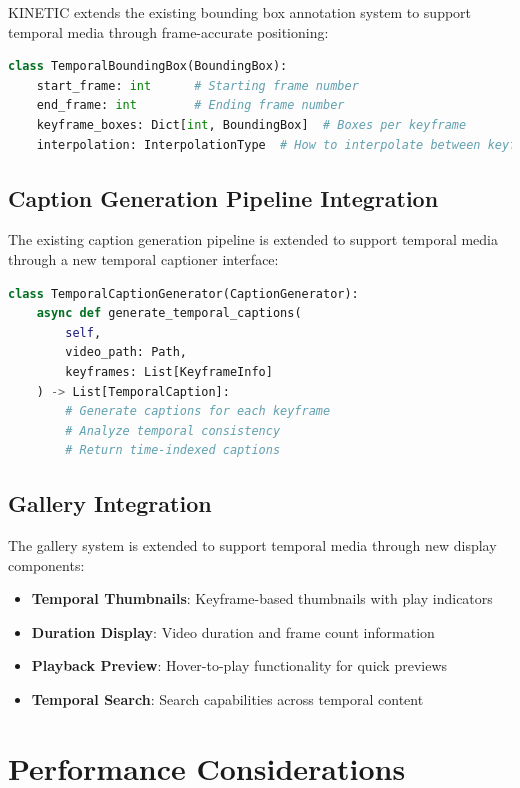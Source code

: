 \documentclass[10pt]{article}
\begin{document}
KINETIC extends the existing bounding box annotation system to support temporal media through frame-accurate positioning:

\begin{lstlisting}[language=Python]
class TemporalBoundingBox(BoundingBox):
    start_frame: int      # Starting frame number
    end_frame: int        # Ending frame number
    keyframe_boxes: Dict[int, BoundingBox]  # Boxes per keyframe
    interpolation: InterpolationType  # How to interpolate between keyframes
\end{lstlisting}

\subsection{Caption Generation Pipeline Integration}

The existing caption generation pipeline is extended to support temporal media through a new temporal captioner interface:

\begin{lstlisting}[language=Python]
class TemporalCaptionGenerator(CaptionGenerator):
    async def generate_temporal_captions(
        self, 
        video_path: Path, 
        keyframes: List[KeyframeInfo]
    ) -> List[TemporalCaption]:
        # Generate captions for each keyframe
        # Analyze temporal consistency
        # Return time-indexed captions
\end{lstlisting}

\subsection{Gallery Integration}

The gallery system is extended to support temporal media through new display components:

\begin{itemize}
    \item \textbf{Temporal Thumbnails}: Keyframe-based thumbnails with play indicators
    \item \textbf{Duration Display}: Video duration and frame count information
    \item \textbf{Playback Preview}: Hover-to-play functionality for quick previews
    \item \textbf{Temporal Search}: Search capabilities across temporal content
\end{itemize}

\section{Performance Considerations}
\end{document}
